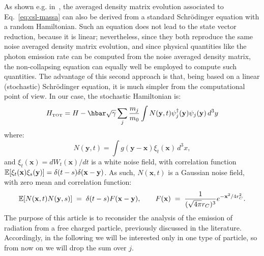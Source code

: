 \documentclass[12pt,onecolumn,amssymb,nofootinbib]{revtex4-2} %
\begin{document}
As shown e.g. in~\cite{ref:fu,ref:im}, the averaged density matrix evolution associated to Eq.~\eqref{eq:csl-massa} can also be derived from a standard Schr\"odinger equation with a random Hamiltonian. Such an equation does not lead to the state vector reduction, because it is linear; nevertheless, since they both reproduce the same noise averaged density matrix evolution, and since physical quantities like the photon emission rate can be computed from the noise averaged density matrix, the non-collapsing equation can equally well be employed to compute such quantities. The advantage of this second approach is that, being based on a linear (stochastic) Schr\"odinger equation, it is much simpler from the computational point of view. In our case, the stochastic Hamiltonian is:
\begin{equation}
H_{\text{\tiny TOT}} = H - \hbar \sqrt{\gamma} \sum_j \frac{m_{j}}{m_{0}}
\int N(\mathbf{y},t)
\psi_{j}^{\dagger}(\mathbf{y}) \psi_{j}(\mathbf{y})\, d^3y
\end{equation}
where:
\begin{equation} \label{eq:sfsoi}
N(\mathbf{y},t) = \int g(\mathbf{y-x})\xi_{t}(\mathbf{x})\, d^3x,
\end{equation}
and $\xi_{t}(\mathbf{x}) = dW_{t}(\mathbf{x})/dt$ is a white noise field, with
correlation function $\mathbb{E}[ \xi_{t}(\mathbf{x}) \xi_{s}(\mathbf{y})] =
\delta(t-s) \delta({\bf x-y})$. As such, $N(\mathbf{x},t)$ is a Gaussian noise
field, with zero mean and correlation function:
\begin{equation} \label{eq:sdfddas}
{\mathbb E}[N(\mathbf{x},t) N(\mathbf{y},s)] \; = \;
\delta(t-s)F({\bf x} - {\bf y}), \qquad  F({\bf x}) \; = \;
\frac{1}{(\sqrt{4 \pi} r_C)^3} e^{-{\bf x}^2/4 r_C^2}.
\end{equation}
The purpose of this article is to reconsider the analysis of the emission of radiation from a
free charged particle, previously discussed in the literature. Accordingly, in the following we will be interested only
in one type of particle, so from now on we will drop the sum over $j$.
\end{document}
